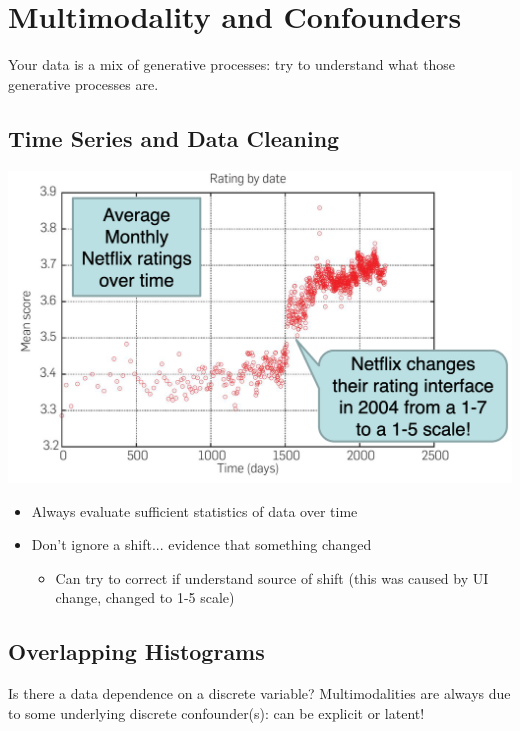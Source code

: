 \documentclass[11pt]{article}
\theoremstyle{definition}
\begin{document}
\section{Multimodality and
Confounders}
Your data is a mix of generative
processes: try to understand what
those generative processes are.

\subsection{Time Series and Data Cleaning}
\includegraphics[width=\textwidth/2]{38.png}
\begin{itemize}
  \item Always evaluate sufficient statistics of data over time
  \item Don’t ignore a shift... evidence that something changed
  \begin{itemize}
    \item Can try to correct if understand source of shift (this was caused by UI change, changed to 1-5 scale)
  \end{itemize}
\end{itemize}
\subsection{Overlapping Histograms}
Is there a data dependence on a discrete variable?
Multimodalities are
always due to some
underlying discrete
confounder(s): can
be explicit or latent!
\end{document}
